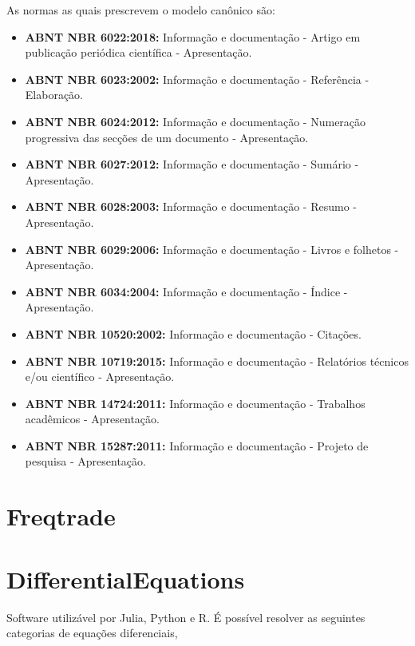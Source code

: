 \documentclass[
12pt,				%
openright,			%
oneside,			%
a4paper,			%
english,			%
french,				%
spanish,			%
brazil,				%
]{abntex2}
\begin{document}
\clearpage

As normas as quais prescrevem o modelo canônico são:

\begin{itemize}
\item \textbf{ABNT NBR 6022:2018:} Informação e documentação -
  Artigo em publicação periódica científica - Apresentação.
\item \textbf{ABNT NBR 6023:2002:} Informação e documentação -
  Referência - Elaboração.
\item \textbf{ABNT NBR 6024:2012:} Informação e documentação -
  Numeração progressiva das secções de um documento - Apresentação.
\item \textbf{ABNT NBR 6027:2012:} Informação e documentação -
  Sumário - Apresentação.
\item \textbf{ABNT NBR 6028:2003:} Informação e documentação -
  Resumo - Apresentação.
\item \textbf{ABNT NBR 6029:2006:} Informação e documentação -
  Livros e folhetos - Apresentação.
\item \textbf{ABNT NBR 6034:2004:} Informação e documentação -
  Índice - Apresentação.
\item \textbf{ABNT NBR 10520:2002:} Informação e documentação -
  Citações.
\item \textbf{ABNT NBR 10719:2015:} Informação e documentação -
  Relatórios técnicos e/ou científico - Apresentação.
\item \textbf{ABNT NBR 14724:2011:} Informação e documentação -
  Trabalhos acadêmicos - Apresentação.
\item \textbf{ABNT NBR 15287:2011:} Informação e documentação -
  Projeto de pesquisa - Apresentação.
\end{itemize}

\section{Freqtrade}


\section{DifferentialEquations}

Software utilizável por Julia, Python e R. É possível resolver as seguintes categorias de equações diferenciais,
\end{document}
